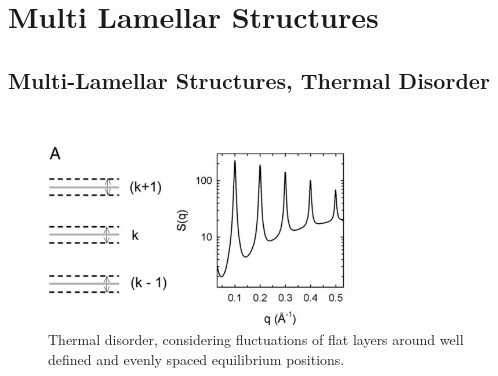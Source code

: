 
\clearpage
\section{Multi Lamellar Structures \cite{Pabst2003,Fruhwirth2004}}
\subsection{Multi-Lamellar Structures, Thermal Disorder} \hspace{1pt}\\

\begin{figure}[htb]
\begin{center}
\includegraphics[width=0.7\textwidth,height=0.4\textwidth]{ThermalDisorderSQ.png}
\end{center}
\caption{Thermal disorder, considering fluctuations of flat layers
around well defined and evenly spaced equilibrium positions.}
\label{ThermalDisorderSQ}
\end{figure}

